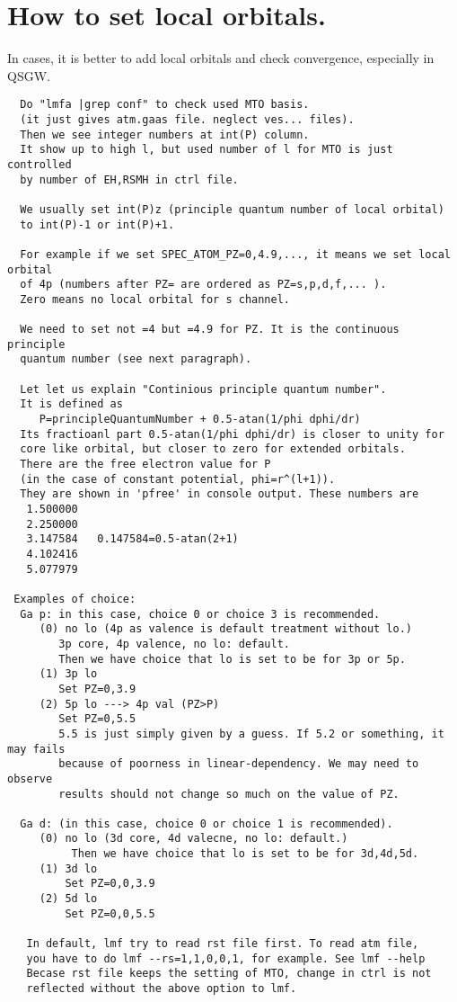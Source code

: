 \documentclass[a4paper,10pt,epsf,fleqn]{article}
\begin{document}
\section{How to set local orbitals.}
In cases, it is better to add local orbitals and check convergence,
especially in QSGW.
\begin{verbatim}
  Do "lmfa |grep conf" to check used MTO basis. 
  (it just gives atm.gaas file. neglect ves... files).
  Then we see integer numbers at int(P) column.
  It show up to high l, but used number of l for MTO is just controlled
  by number of EH,RSMH in ctrl file.

  We usually set int(P)z (principle quantum number of local orbital) 
  to int(P)-1 or int(P)+1.
  
  For example if we set SPEC_ATOM_PZ=0,4.9,..., it means we set local orbital
  of 4p (numbers after PZ= are ordered as PZ=s,p,d,f,... ).
  Zero means no local orbital for s channel.

  We need to set not =4 but =4.9 for PZ. It is the continuous principle
  quantum number (see next paragraph).

  Let let us explain "Continious principle quantum number". 
  It is defined as
     P=principleQuantumNumber + 0.5-atan(1/phi dphi/dr) 
  Its fractioanl part 0.5-atan(1/phi dphi/dr) is closer to unity for
  core like orbital, but closer to zero for extended orbitals.
  There are the free electron value for P 
  (in the case of constant potential, phi=r^(l+1)). 
  They are shown in 'pfree' in console output. These numbers are
   1.500000 
   2.250000 
   3.147584   0.147584=0.5-atan(2+1)
   4.102416
   5.077979

 Examples of choice:
  Ga p: in this case, choice 0 or choice 3 is recommended.
     (0) no lo (4p as valence is default treatment without lo.)
        3p core, 4p valence, no lo: default.
        Then we have choice that lo is set to be for 3p or 5p.
     (1) 3p lo 
        Set PZ=0,3.9 
     (2) 5p lo ---> 4p val (PZ>P)
        Set PZ=0,5.5
        5.5 is just simply given by a guess. If 5.2 or something, it may fails
        because of poorness in linear-dependency. We may need to observe
        results should not change so much on the value of PZ.

  Ga d: (in this case, choice 0 or choice 1 is recommended).
     (0) no lo (3d core, 4d valecne, no lo: default.)
          Then we have choice that lo is set to be for 3d,4d,5d.
     (1) 3d lo 
         Set PZ=0,0,3.9  
     (2) 5d lo 
         Set PZ=0,0,5.5

   In default, lmf try to read rst file first. To read atm file,
   you have to do lmf --rs=1,1,0,0,1, for example. See lmf --help
   Becase rst file keeps the setting of MTO, change in ctrl is not
   reflected without the above option to lmf.
\end{verbatim}
\end{document}
